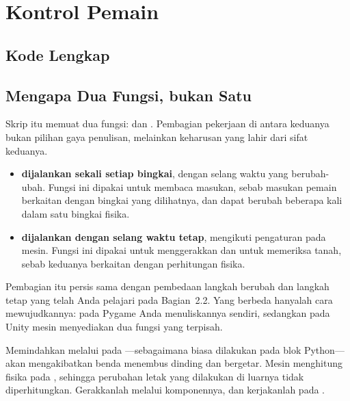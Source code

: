 \section{Kontrol Pemain}
\label{sec:kontrol-pemain}

\subsection{Kode Lengkap}


\subsection{Mengapa Dua Fungsi, bukan Satu}

Skrip itu memuat dua fungsi:  dan
. Pembagian pekerjaan di antara keduanya bukan pilihan gaya
penulisan, melainkan keharusan yang lahir dari sifat keduanya.

\begin{itemize}
  \item \textbf{ dijalankan sekali setiap bingkai}, dengan selang
        waktu yang berubah-ubah. Fungsi ini dipakai untuk membaca masukan,
        sebab masukan pemain berkaitan dengan bingkai yang dilihatnya, dan
        dapat berubah beberapa kali dalam satu bingkai fisika.
  \item \textbf{ dijalankan dengan selang waktu tetap},
        mengikuti pengaturan  pada mesin. Fungsi ini
        dipakai untuk menggerakkan  dan untuk memeriksa
        tanah, sebab keduanya berkaitan dengan perhitungan fisika.
\end{itemize}

Pembagian itu persis sama dengan pembedaan langkah berubah dan langkah tetap
yang telah Anda pelajari pada Bagian~2.2. Yang berbeda hanyalah cara
mewujudkannya: pada Pygame Anda menuliskannya sendiri, sedangkan pada Unity
mesin menyediakan dua fungsi yang terpisah.

\begin{peringatanbox}
Memindahkan  melalui  pada
---sebagaimana biasa dilakukan pada blok Python---akan
mengakibatkan benda menembus dinding dan bergetar. Mesin menghitung fisika pada
, sehingga perubahan letak yang dilakukan di luarnya tidak
diperhitungkan. Gerakkanlah  melalui komponennya, dan
kerjakanlah pada .
\end{peringatanbox}

